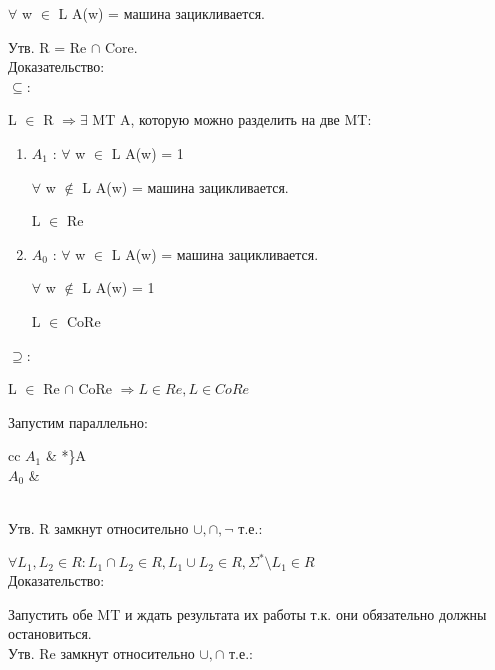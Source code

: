 \documentclass{scrartcl}
\begin{document}
$\forall$ w $\in$ L A(w) = машина зацикливается.

\begin{figure}[h]
\centering
\def\seta{(0,0) circle (2.5)}
\def\setb{(-0.6,-0.8) circle (1.1)}
\def\setc{(0.6,-0.8) circle (1.1)}
\end{figure}
Утв. R = Re $\cap$ Core.\\
Доказательство:\\
$\subseteq$:

L $\in$ R $\Rightarrow \exists$ MT A, которую можно разделить на две MT:
\begin{enumerate}
\item $A_1$ : $\forall$ w $\in$ L A(w) = 1

\hspace*{8mm}$\forall$ w $\not\in$ L A(w) = машина зацикливается.

L $\in$ Re
\item $A_0$ : $\forall$ w $\in$ L A(w) = машина зацикливается.

\hspace*{8mm}$\forall$ w $\not\in$ L A(w) = 1

L $\in$ CoRe
\end{enumerate}
$\supseteq$:

L $\in$ Re $\cap$ CoRe $\Rightarrow L \in Re, L \in CoRe$

Запустим параллельно:

\begin{tabular}{cc}
$A_1$ & *{\huge\}\large A}\\
$A_0$ & \\
\end{tabular}\\
Утв. R замкнут относительно $\cup, \cap, \neg$ т.е.:

$\forall L_1, L_2 \in R : L_1 \cap L_2 \in R, L_1 \cup L_2 \in R, \Sigma^* \setminus L_1 \in R$\\
Доказательство:

Запустить обе MT и ждать результата их работы т.к. они обязательно должны остановиться.\\
Утв. Re замкнут относительно $\cup, \cap$ т.е.:
\end{document}
